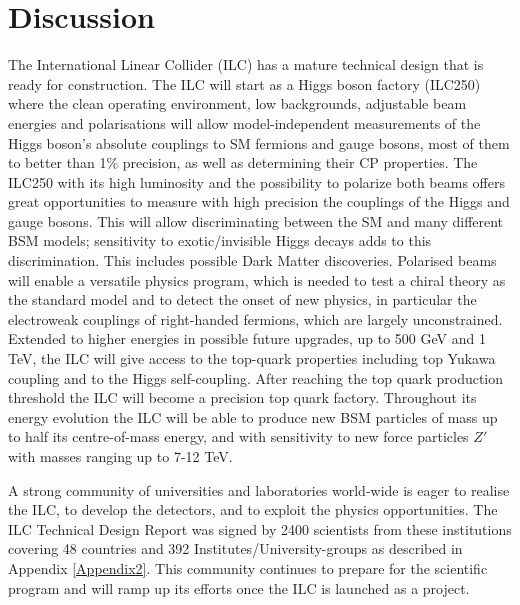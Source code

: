 \documentclass[%
 reprint,
 amsmath,amssymb,
 aps,
]{revtex4-1}
\newcommand{\todo}[1]{\textcolor{red}{{#1}}}
\begin{document}
\section{\label{sec:discuss}Discussion}



The International Linear Collider (ILC) has a mature technical design that is ready for construction. The ILC will start as a Higgs boson factory (ILC250) where the clean operating environment, low backgrounds, adjustable beam energies and polarisations will allow model-independent measurements of the Higgs boson's absolute couplings to SM fermions and gauge bosons, most of them to better than 1\% precision, as well as determining their CP properties. The ILC250 with its high luminosity and the possibility to polarize both beams offers great opportunities to measure with high precision the couplings of the Higgs and gauge bosons. This will allow discriminating between the SM and many different BSM models; sensitivity to exotic/invisible Higgs decays adds to this discrimination. This includes  possible Dark Matter discoveries. Polarised beams will enable a versatile physics program, which is needed to test a chiral theory as the standard model and to detect the onset of new physics, in particular the electroweak couplings of right-handed fermions, which are largely unconstrained. Extended to higher energies in possible future upgrades, up to 500 GeV and 1 TeV, the ILC will give access to the top-quark properties including top Yukawa coupling and to the Higgs self-coupling. After reaching the top quark production threshold the ILC will become a precision top quark factory. Throughout its energy evolution  the ILC will be able to produce new BSM particles of mass up to half its centre-of-mass energy, and with sensitivity to new force particles $Z'$ with masses ranging up to 7-12 TeV. 

A strong community of universities and laboratories world-wide is eager to realise the ILC, to develop the detectors, and to exploit the physics opportunities.  The ILC Technical Design Report was signed by
2400 scientists from these institutions covering 48 countries and 392 Institutes/University-groups as described in Appendix \ref{Appendix2}.  This community continues to prepare for the scientific program and
will ramp up its efforts once the ILC is launched as a project.
\end{document}
